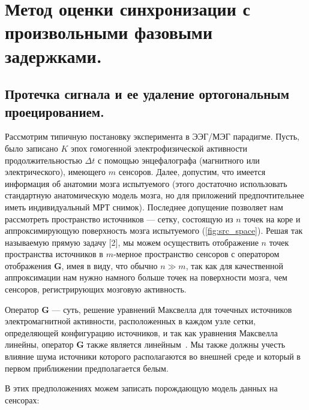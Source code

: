 


\chapter{Метод оценки синхронизации с произвольными фазовыми задержками.}\label{chapt2}
\section{Протечка сигнала и ее удаление ортогональным проецированием.}\label{sect1_1}


Рассмотрим типичную постановку эксперимента в ЭЭГ/МЭГ парадигме.
Пусть, было записано $K$ эпох гомогенной электрофизической
активности продолжительностью $\Delta t$ с помощью энцефалографа (магнитного или электрического),
имеющего $m$ сенсоров.
Далее, допустим, что имеется информация об анатомии мозга испытуемого (этого достаточно
использовать стандартную анатомическую модель мозга,
но для приложений предпочтительнее иметь индивидуальный МРТ снимок).
Последнее допущение позволяет нам рассмотреть пространство источников --- сетку,
состоящую из $n$ точек на коре и аппроксимирующую поверхность мозга испытуемого (\ref{fig:src_space}).
Решая так называемую прямую задачу [2], мы можем осуществить отображение $n$ точек пространства
источников в $m$-мерное пространство сенсоров с оператором отображения $\mathbf{G}$, имея в виду, что
обычно $n \gg m$, так как для качественной аппроксимации нам нужно намного
больше точек на поверхности мозга, чем сенсоров, регистрирующих мозговую активность.

Оператор $\mathbf{G}$ --- суть, решение уравнений Максвелла для точечных источников электромагнитной активности,
расположенных в каждом узле сетки, определяющей конфигурацию источников,
и так как уравнения Максвелла линейны, оператор $\mathbf{G}$ также является линейным~\cite{Hamalainen1993}.
Мы также должны учесть влияние шума источники которого располагаются во внешней среде
и который в первом приближении предполагается белым.

В этих предположениях можем записать порождающую модель данных на сенсорах:

